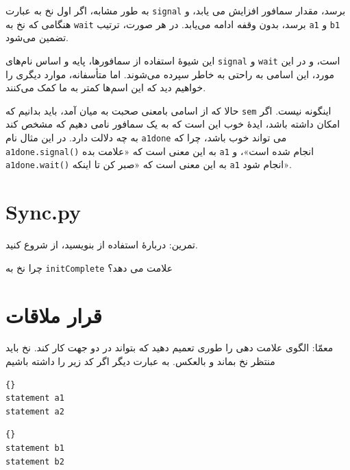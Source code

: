 \documentclass{book}
\begin{document}
به طور مشابه، اگر اول نخ  به عبارت \texttt{signal} برسد، مقدار سمافور افزایش می یابد، و هنگامی که نخ  
به \texttt{wait} برسد، بدون وقفه ادامه می‌یابد. در هر صورت، ترتیب \texttt{a1} و \texttt{b1} تضمین می‌شود.

این شیوهٔ استفاده از سمافورها، پایه و اساس نام‌های \texttt{signal} و \texttt{wait} است، 
و در این مورد، این اسامی به راحتی به خاطر سپرده می‌شوند. اما متأسفانه، موارد دیگری را خواهیم دید که این اسم‌ها کمتر به ما کمک می‌کنند.

حالا که از اسامی بامعنی صحبت به میان آمد، باید بدانیم که \texttt{sem} اینگونه نیست.
اگر امکان داشته باشد، ایدهٔ خوب این است که به یک سمافور نامی دهیم که مشخص کند به چه دلالت دارد. 
در این مثال نام \texttt{a1done} می تواند خوب باشد، چرا که \texttt{ a1done.signal()} 
به این معنی است که «علامت بده \texttt{a1} انجام شده است»، و \texttt{a1done.wait()} 
به این معنی است که «صبر کن تا اینکه \texttt{a1} انجام شود».

\section{Sync.py}
\label{sync.py}
    تمرین: دربارهٔ استفاده از  بنویسید، از  شروع کنید.

چرا نخ  به \texttt{initComplete} علامت می دهد؟


\section{قرار ملاقات}
\label{rendezvous}

معمّا: الگوی علامت دهی را طوری تعمیم دهید که بتواند در دو جهت کار کند. 
نخ  باید منتظر نخ  بماند و بالعکس. به عبارت دیگر اگر کد زیر را داشته باشیم

\begin{latin}
\begin{minipage}[t]{2in}
\begin{latin}
\begin{lstlisting}[title=\rl{نخ \lr{A}}]{}
statement a1
statement a2
\end{lstlisting}
\end{latin}
\end{minipage}
\hfill
\begin{minipage}[t]{2in}
\begin{latin}
\begin{lstlisting}[title=\rl{نخ \lr{B}}]{}
statement b1
statement b2
\end{lstlisting}
\end{latin}
\end{minipage}
\end{latin}
\end{document}
